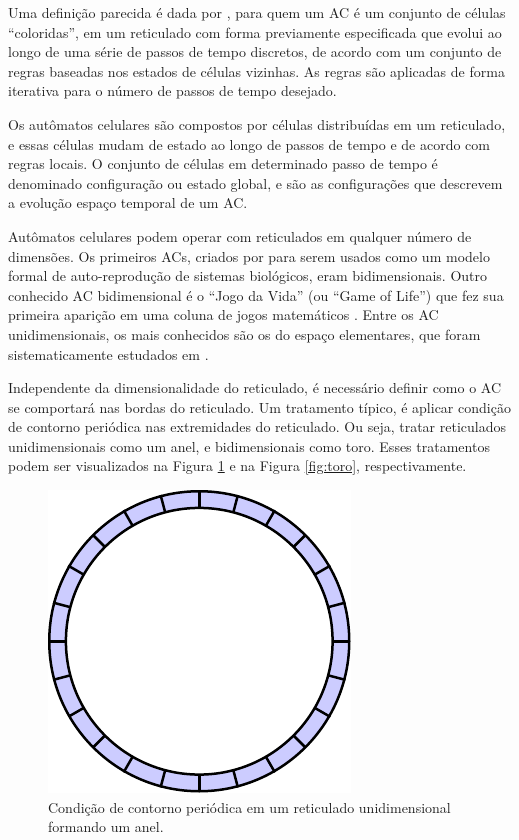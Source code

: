 \documentclass[12pt,a4paper]{article}
\begin{document}
Uma definição parecida é dada por , para quem um AC é um conjunto de células ``coloridas'', em um reticulado com forma previamente especificada que evolui ao longo de uma série de passos de tempo discretos, de acordo com um conjunto de regras baseadas nos estados de células vizinhas. As regras são aplicadas de forma iterativa para o número de passos de tempo desejado.

Os autômatos celulares são compostos por células distribuídas em um reticulado, e essas células mudam de estado ao longo de passos de tempo e de acordo com regras locais. O conjunto de células em determinado passo de tempo é denominado configuração ou estado global, e são as configurações que descrevem a evolução espaço temporal de um AC. 

Autômatos celulares podem operar com reticulados em qualquer número de dimensões. Os primeiros ACs, criados por  para serem usados como um modelo formal de auto-reprodução de sistemas biológicos, eram bidimensionais. Outro conhecido AC bidimensional é o ``Jogo da Vida'' (ou ``Game of Life'') que fez sua primeira aparição em uma coluna de jogos matemáticos \cite{GardnerM1970}. Entre os AC unidimensionais, os mais conhecidos são os do espaço elementares, que foram sistematicamente estudados em .

Independente da dimensionalidade do reticulado, é necessário definir como o AC se comportará nas bordas do reticulado. Um tratamento típico, é aplicar condição de contorno periódica nas extremidades do reticulado. Ou seja, tratar reticulados unidimensionais como um anel, e bidimensionais como toro. Esses tratamentos podem ser visualizados na Figura \ref{fig:anel} e na Figura \ref{fig:toro}, respectivamente.  
	\begin{figure}[h!]
	  \centering
	  \includegraphics[width=.3\textwidth]{fig_circularList.pdf}
	  \caption{Condição de contorno periódica em um reticulado unidimensional formando um anel.}
	  \label{fig:anel}
	\end{figure}
\end{document}
